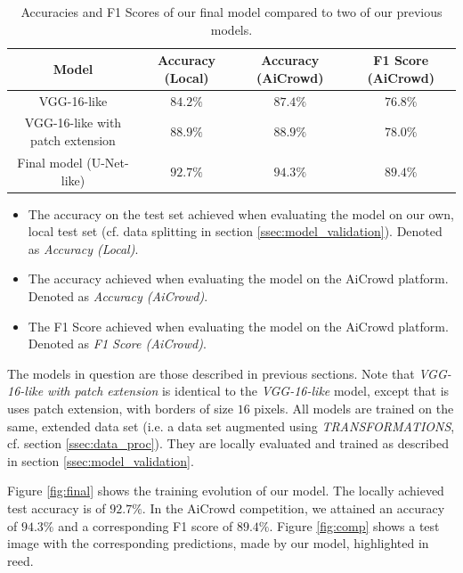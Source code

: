 \documentclass[10pt,conference,compsocconf]{IEEEtran}
\begin{document}
\begin{table}[h]
	\centering
	\begin{tabular}{ |c|c|c|c| } 
		\hline
		\textbf{Model} & \textbf{Accuracy (Local)} & \textbf{Accuracy (AiCrowd)} & \textbf{F1 Score (AiCrowd)} \\
		\hline
		VGG-16-like & $84.2\%$ & $87.4\%$ & $76.8\%$ \\ 
		VGG-16-like with patch extension & $88.9\%$ & $88.9\%$ & $78.0\%$\\ 
		Final model (U-Net-like) & $92.7\%$ & $94.3\%$ & $89.4\%$ \\ 
		\hline
	\end{tabular}
	\captionsetup{aboveskip=0.3cm,justification=centering, margin=0.1cm, labelfont=footnotesize, textfont=footnotesize}
	\caption{Accuracies and F1 Scores of our final model compared to two of our previous models.}
	\label{tab:model_accuracy}
\end{table}

\begin{itemize}
	\item The accuracy on the test set achieved when evaluating the model on our own, local test set (cf. data splitting in section \ref{ssec:model_validation}). Denoted as \textit{Accuracy (Local)}.
	\item The accuracy achieved when evaluating the model on the AiCrowd platform. Denoted as \textit{Accuracy (AiCrowd)}.
	\item The F1 Score achieved when evaluating the model on the AiCrowd platform. Denoted as \textit{F1 Score (AiCrowd)}.
\end{itemize}
The models in question are those described in previous sections. Note that \textit{VGG-16-like with patch extension} is identical to the \textit{VGG-16-like} model, except that is uses patch extension, with borders of size $16$ pixels. All models are trained on the same, extended data set (i.e. a data set augmented using \textit{TRANSFORMATIONS}, cf. section \ref{ssec:data_proc}). They are locally evaluated and trained as described in section \ref{ssec:model_validation}.

Figure \ref{fig:final} shows the training evolution of our model. The locally achieved test accuracy is of $92.7\%$. In the AiCrowd competition, we attained an accuracy of $94.3\%$ and a corresponding F1 score of $89.4\%$. Figure \ref{fig:comp} shows a test image with the corresponding predictions, made by our model, highlighted in reed.
\end{document}

